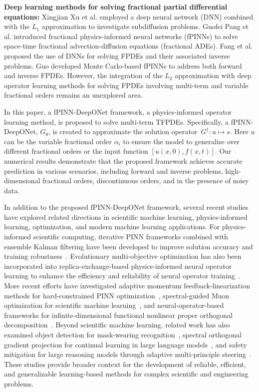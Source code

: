 \documentclass[11pt]{article}
\providecommand{\bh}[1]{#1}
\begin{document}
\bh{{\bf Deep learning methods for solving fractional partial differential equations:} Xingjian Xu et al.\cite{xu2022discovery} employed a deep neural network (DNN) combined with the $L_1$ approximation to investigate subdiffusion problems. Guofei Pang et al.\cite{pang2019fpinns} introduced fractional physics-informed neural networks (fPINNs) to solve space-time fractional advection-diffusion equations (fractional ADEs). Fang et al.\cite{fang2023explore} proposed the use of DNNs for solving FPDEs and their associated inverse problems. Guo\cite{guo2022monte} developed Monte Carlo-based fPINNs to address both forward and inverse FPDEs. However, the integration of the $L_2$ approximation with deep operator learning methods for solving FPDEs involving multi-term and variable fractional orders remains an unexplored area. } 


In this paper, a fPINN-DeepONet framework, a physics-informed operator learning method, is proposed to solve multi-term TFPDEs. Specifically, a fPINN-DeepONet, $G_\theta$, is created to approximate the solution operator~$G^\dagger: u \mapsto s$. Here $u$ can be the variable fractional order $\alpha_i$ to ensure the model to generalize over different fractional orders or the input function $[u(x,0),f(x,t)]$. Our numerical results demonstrate that the proposed framework achieves accurate prediction in various scenarios, including forward and inverse problems, high-dimensional fractional orders, discontinuous orders, and in the presence of noisy data.

In addition to the proposed fPINN-DeepONet framework, several recent studies have explored related directions in scientific machine learning, physics-informed learning, optimization, and modern machine learning applications. For physics-informed scientific computing, iterative PINN frameworks combined with ensemble Kalman filtering have been developed to improve solution accuracy and training robustness~\cite{lu2025ipinner}. Evolutionary multi-objective optimization has also been incorporated into replica-exchange-based physics-informed neural operator learning to enhance the efficiency and reliability of neural operator training~\cite{lu2025morephynet}. More recent efforts have investigated adaptive momentum feedback-linearization methods for hard-constrained PINN optimization~\cite{lu2026adamflip}, spectral-guided Muon optimization for scientific machine learning~\cite{lu2026spectralguidance}, and neural-operator-based frameworks for infinite-dimensional functional nonlinear proper orthogonal decomposition~\cite{mou2026neuralpod}. Beyond scientific machine learning, related work has also examined  object detection for mask-wearing recognition~\cite{liu2020yolov5mask}, spectral orthogonal gradient projection for continual learning in large language models~\cite{lu2026muonogd}, and safety mitigation for large reasoning models through adaptive multi-principle steering~\cite{li2026chainrisk}. These studies provide broader context for the development of reliable, efficient, and generalizable learning-based methods for complex scientific and engineering problems.
\end{document}
